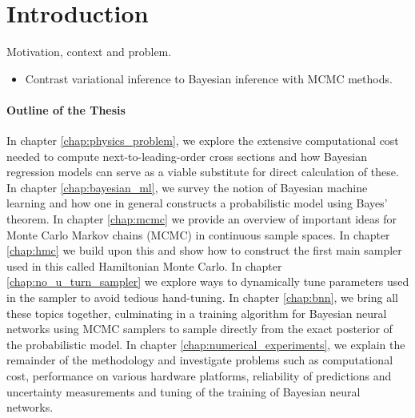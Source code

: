 \chapter*{Introduction}

Motivation, context and problem.


\begin{itemize}
    \item Contrast variational inference to Bayesian inference with MCMC methods.
\end{itemize}   



\subsubsection*{Outline of the Thesis}
In chapter \ref{chap:physics_problem}, we explore the extensive computational cost needed to compute next-to-leading-order cross sections and how Bayesian regression models can serve as a viable substitute for direct calculation of these. In chapter \ref{chap:bayesian_ml}, we survey the notion of Bayesian machine learning and how one in general constructs a probabilistic model using Bayes' theorem. In chapter \ref{chap:mcmc} we provide an overview of important ideas for Monte Carlo Markov chains (MCMC) in continuous sample spaces. In chapter \ref{chap:hmc} we build upon this and show how to construct the first main sampler used in this called Hamiltonian Monte Carlo. In chapter \ref{chap:no_u_turn_sampler} we explore ways to dynamically tune parameters used in the sampler to avoid tedious hand-tuning. In chapter \ref{chap:bnn}, we bring all these topics together, culminating in a training algorithm for Bayesian neural networks using MCMC samplers to sample directly from the exact posterior of the probabilistic model. In chapter \ref{chap:numerical_experiments}, we explain the remainder of the methodology and investigate problems such as computational cost, performance on various hardware platforms, reliability of predictions and uncertainty measurements and tuning of the training of Bayesian neural networks.
